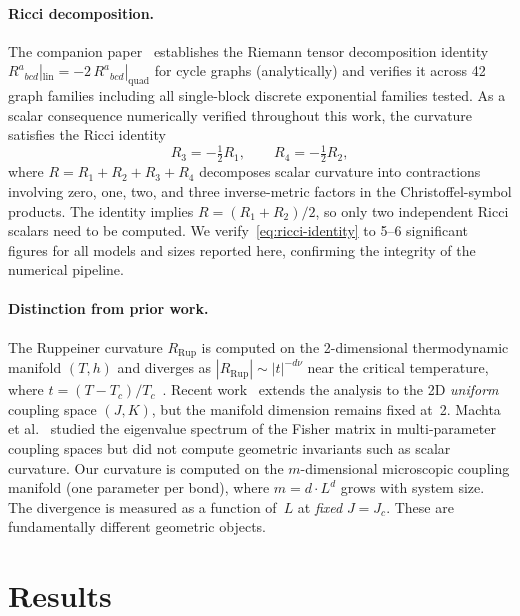 \documentclass[aps,prl,twocolumn,superscriptaddress,showpacs]{revtex4-2}
\newcommand{\Scal}{R}
\newcommand{\Jc}{J_c}
\begin{document}
\paragraph{Ricci decomposition.}
The companion paper~\cite{Paper7} establishes the Riemann tensor decomposition
identity $R^a{}_{bcd}|_{\mathrm{lin}} = -2\,R^a{}_{bcd}|_{\mathrm{quad}}$
for cycle graphs (analytically) and verifies it across 42 graph families
including all single-block discrete exponential families tested.
As a scalar consequence numerically verified throughout this work, the curvature satisfies the Ricci identity
\begin{equation}
  R_3 = -\tfrac{1}{2} R_1, \qquad R_4 = -\tfrac{1}{2} R_2,
  \label{eq:ricci-identity}
\end{equation}
where $R = R_1 + R_2 + R_3 + R_4$ decomposes scalar curvature into
contractions involving zero, one, two, and three inverse-metric factors
in the Christoffel-symbol products. The identity implies $\Scal = (R_1 + R_2)/2$,
so only two independent Ricci scalars need to be computed.
We verify~\eqref{eq:ricci-identity} to 5--6 significant figures for all
models and sizes reported here, confirming the integrity of the numerical
pipeline.

\paragraph{Distinction from prior work.}
The Ruppeiner curvature $\Scal_{\mathrm{Rup}}$ is computed on the
2-dimensional thermodynamic manifold $(T, h)$ and diverges as
$|\Scal_{\mathrm{Rup}}| \sim |t|^{-d\nu}$ near the critical temperature,
where $t = (T - T_c)/T_c$~\cite{Ruppeiner1979,BrodyRitz2003}.
Recent work~\cite{Erdmenger2020} extends the analysis to the 2D
\emph{uniform} coupling space $(J, K)$, but the manifold dimension
remains fixed at~2.  Machta et al.~\cite{Machta2013} studied the
eigenvalue spectrum of the Fisher matrix in multi-parameter coupling
spaces but did not compute geometric invariants such as scalar curvature.
Our curvature is computed on the
$m$-dimensional microscopic coupling manifold (one parameter per bond),
where $m = d \cdot L^d$ grows with system size.  The divergence
is measured as a function of~$L$ at \emph{fixed} $J = \Jc$.
These are fundamentally different geometric objects.


\section{Results}
\end{document}
